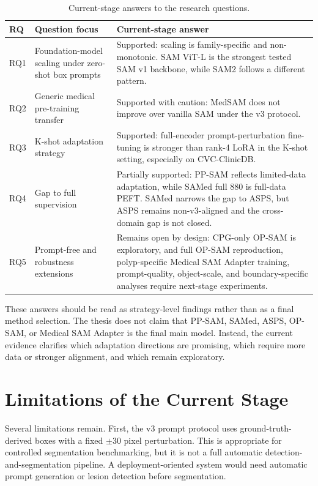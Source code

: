 \begin{table}[H]
\centering
\caption{Current-stage answers to the research questions.}
\label{tab:rq-answer-summary}
\begin{tabular}{p{1.5cm}p{5.8cm}p{6.1cm}}
\toprule
\textbf{RQ} & \textbf{Question focus} & \textbf{Current-stage answer} \\
\midrule
RQ1 & Foundation-model scaling under zero-shot box prompts & Supported: scaling is family-specific and non-monotonic. SAM ViT-L is the strongest tested SAM v1 backbone, while SAM2 follows a different pattern. \\
RQ2 & Generic medical pre-training transfer & Supported with caution: MedSAM does not improve over vanilla SAM under the v3 protocol. \\
RQ3 & K-shot adaptation strategy & Supported: full-encoder prompt-perturbation fine-tuning is stronger than rank-4 LoRA in the K-shot setting, especially on CVC-ClinicDB. \\
RQ4 & Gap to full supervision & Partially supported: PP-SAM reflects limited-data adaptation, while SAMed full 880 is full-data PEFT. SAMed narrows the gap to ASPS, but ASPS remains non-v3-aligned and the cross-domain gap is not closed. \\
RQ5 & Prompt-free and robustness extensions & Remains open by design: CPG-only OP-SAM is exploratory, and full OP-SAM reproduction, polyp-specific Medical SAM Adapter training, prompt-quality, object-scale, and boundary-specific analyses require next-stage experiments. \\
\bottomrule
\end{tabular}
\end{table}

These answers should be read as strategy-level findings rather than as a final method selection. The thesis does not claim that PP-SAM, SAMed, ASPS, OP-SAM, or Medical SAM Adapter is the final main model. Instead, the current evidence clarifies which adaptation directions are promising, which require more data or stronger alignment, and which remain exploratory.

\section{Limitations of the Current Stage}
\label{sec:limitations}

Several limitations remain. First, the v3 prompt protocol uses ground-truth-derived boxes with a fixed $\pm30$ pixel perturbation. This is appropriate for controlled segmentation benchmarking, but it is not a full automatic detection-and-segmentation pipeline. A deployment-oriented system would need automatic prompt generation or lesion detection before segmentation.

